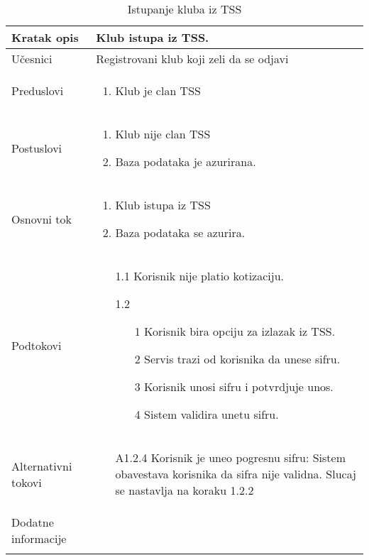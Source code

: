 \documentclass{article}
\begin{document}
\begin{longtable}{| p{} | p{} |} 
\hline
    Kratak opis & Klub istupa iz TSS.\\ 
\hline    
    Učesnici & 
         Registrovani klub koji zeli da se odjavi
    \\
\hline
   Preduslovi & \begin{enumerate}
       \item Klub je clan TSS
   \end{enumerate}\\
\hline  
    Postuslovi & \begin{enumerate}
        \item Klub nije clan TSS
        \item Baza podataka je azurirana.
    \end{enumerate}\\
\hline
    Osnovni tok & \begin{enumerate}
        \item Klub istupa iz TSS
        \item Baza podataka se azurira.
    \end{enumerate}
    \\

\hline
    Podtokovi &  \begin{enumerate}
        \item[1.1] Korisnik nije platio kotizaciju.
        \item[1.2]  \begin{enumerate}
            \item[1]  Korisnik bira opciju za izlazak iz TSS.
            \item[2] Servis trazi od korisnika da unese sifru.
            \item[3] Korisnik unosi sifru i potvrdjuje unos.
            \item[4] Sistem validira unetu sifru.
        \end{enumerate}
    \end{enumerate}\\
  \hline  
    Alternativni tokovi & \begin{enumerate}
            \item[A1.2.4] Korisnik je uneo pogresnu sifru: Sistem obavestava korisnika da sifra nije validna. Slucaj se nastavlja na koraku 1.2.2  
        \end{enumerate}\\



\hline
    Dodatne informacije & \\
\hline
\caption{Istupanje kluba iz TSS} %
\end{longtable}


\end{document}
